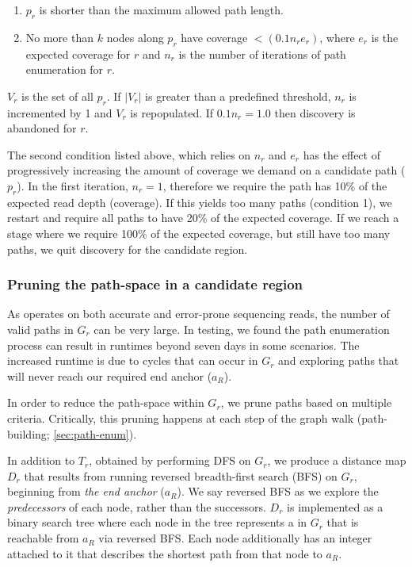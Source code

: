 \begin{enumerate}
  \item $p_r$ is shorter than the maximum allowed path length.
  \item No more than $k$ nodes along $p_r$ have coverage $< (0.1 n_r e_r)$, where $e_r$ is the expected \kmer{} coverage for $r$ and $n_r$ is the number of iterations of path enumeration for $r$.
\end{enumerate}

$V_r$ is the set of all $p_r$. If $|V_r|$ is greater than a predefined threshold, $n_r$ is incremented by 1 and $V_r$ is repopulated. If $0.1n_r = 1.0$ then \denovo{} discovery is abandoned for $r$.

The second condition listed above, which relies on $n_r$ and $e_r$ has the effect of progressively increasing the amount of coverage we demand on a candidate path ($p_r$). In the first iteration, $n_r=1$, therefore we require the path has 10\% of the expected read depth (coverage). If this yields too many paths (condition 1), we restart and require all paths to have 20\% of the expected coverage. If we reach a stage where we require 100\% of the expected coverage, but still have too many paths, we quit \denovo{} discovery for the candidate region.

\subsubsection{Pruning the path-space in a candidate region}

As \pandora{} operates on both accurate and error-prone sequencing reads, the number of valid paths in $G_r$ can be very large. In testing, we found the path enumeration process can result in runtimes beyond seven days in some scenarios. The increased runtime is due to cycles that can occur in $G_r$ and exploring paths that will never reach our required end anchor ($a_R$). 

In order to reduce the path-space within $G_r$, we prune paths based on multiple criteria. Critically, this pruning happens at each step of the graph walk (path-building; \autoref{sec:path-enum}).

In addition to $T_r$, obtained by performing DFS on $G_r$, we produce a distance map $D_r$ that results from running reversed breadth-first search (BFS) on $G_r$, beginning from \emph{the end anchor} ($a_R$). We say reversed BFS as we explore the \emph{predecessors} of each node, rather than the successors. $D_r$ is implemented as a binary search tree where each node in the tree represents a \kmer{} in $G_r$ that is reachable from $a_R$ via reversed BFS. Each node additionally has an integer attached to it that describes the shortest path from that node to $a_R$.

